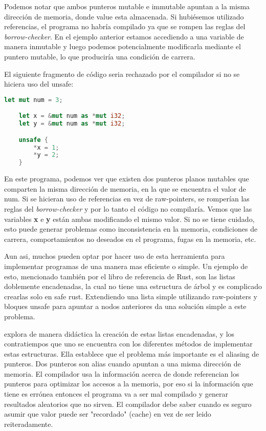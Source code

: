 Podemos notar que ambos punteros mutable e immutable apuntan a la misma dirección de memoria, donde value esta almacenada. Si hubiésemos utilizado referencias, el programa no habría compilado ya que se rompen las reglas del \textit{borrow-checker}. En el ejemplo anterior estamos accediendo a una variable de manera inmutable y luego podemos potencialmente modificarla mediante el puntero mutable, lo que produciría una condición de carrera.

El siguiente fragmento de código seria rechazado por el compilador si no se hiciera uso del unsafe:
\begin{lstlisting}[language=Rust]
    let mut num = 3;

    let x = &mut num as *mut i32;
    let y = &mut num as *mut i32;

    unsafe {
        *x = 1;
        *y = 2;
    }
\end{lstlisting}

En este programa, podemos ver que existen dos punteros planos mutables que comparten la misma dirección de memoria, en la que se encuentra el valor de num. Si se hicieran uso de referencias en vez de raw-pointers, se romperían las reglas del \textit{borrow-checker} y por lo tanto el código no compilaría. Vemos que las variables \textbf{x} e \textbf{y} están ambas modificando el mismo valor. Si no se tiene cuidado, esto puede generar problemas como inconsistencia en la memoria, condiciones de carrera, comportamientos no deseados en el programa, fugas en la memoria, etc.

Aun asi, muchos pueden optar por hacer uso de esta herramienta para implementar programas de una manera mas eficiente o simple. Un ejemplo de esto, mencionado también por el libro de referencia de Rust, son las listas doblemente encadenadas, la cual no tiene una estructura de árbol y es complicado crearlas solo en safe rust. Extendiendo una lista simple utilizando raw-pointers y bloques unsafe para apuntar a nodos anteriores da una solución simple a este problema.

 explora de manera didáctica la creación de estas listas encadenadas, y los contratiempos que uno se encuentra con los diferentes métodos de implementar estas estructuras. Ella establece que el problema más importante es el aliasing de punteros. Dos punteros son alias cuando apuntan a una misma dirección de memoria. El compilador usa la información acerca de donde referencian los punteros para optimizar los accesos a la memoria, por eso si la información que tiene es errónea entonces el programa va a ser mal compilado y generar resultados aleatorios que no sirven. El compilador debe saber cuando es seguro asumir que valor puede ser "recordado" (cache) en vez de ser leido reiteradamente.

